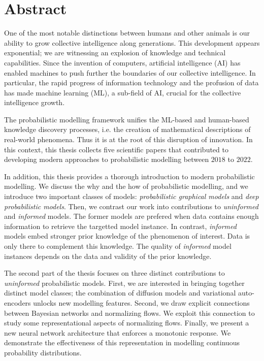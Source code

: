 
\chapter*{Abstract}
One of the most notable distinctions between humans and other animals is our ability to grow collective intelligence along generations. This development appears exponential; we are witnessing an explosion of knowledge and technical capabilities. Since the invention of computers, artificial intelligence (AI) has enabled machines to push further the boundaries of our collective intelligence.
In particular, the rapid progress of information technology and the profusion of data has made machine learning (ML), a sub-field of AI, crucial for the collective intelligence growth.

The probabilistic modelling framework unifies the ML-based and human-based knowledge discovery processes, i.e. the creation of mathematical descriptions of real-world phenomena. Thus it is at the root of this disruption of innovation. In this context, this thesis collects five scientific papers that contributed to developing modern approaches to probabilistic modelling between $2018$ to $2022$.

In addition, this thesis provides a thorough introduction to modern probabilistic modelling. We discuss the why and the how of probabilistic modelling, and we introduce two important classes of models: \textit{probabilistic graphical models} and \textit{deep probabilistic models}. Then, we contrast our work into contributions to \textit{uninformed} and \textit{informed} models. The former models are prefered when data contains enough information to retrieve the targetted model instance. In contrast, \textit{informed} models embed stronger prior knowledge of the phenomenon of interest. Data is only there to complement this knowledge. The quality of \textit{informed} model instances depends on the data and validity of the prior knowledge.

The second part of the thesis focuses on three distinct contributions to \textit{uninformed} probabilistic models. First, we are interested in bringing together distinct model classes; the combination of diffusion models and variational auto-encoders unlocks new modelling features. Second, we draw explicit connections between Bayesian networks and normalizing flows. We exploit this connection to study some representational aspects of normalizing flows. Finally, we present a new neural network architecture that enforces a monotonic response. We demonstrate the effectiveness of this representation in modelling continuous probability distributions.

